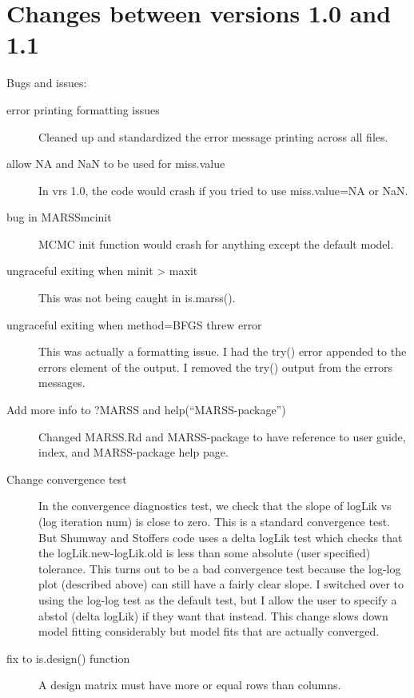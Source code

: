 \documentclass[12pt]{article}
\begin{document}
\section{Changes between versions 1.0 and 1.1}
Bugs and issues:
\begin{description}
    \item[error printing formatting issues]Cleaned up and standardized the error message printing across all files.
    \item[allow NA and NaN to be used for miss.value]In vrs 1.0, the code would crash if you tried to use miss.value=NA or NaN.
    \item[bug in MARSSmcinit]MCMC init function would crash for anything except the default model.
    \item[ungraceful exiting when minit > maxit]This was not being caught in is.marss().
    \item[ungraceful exiting when method=BFGS threw error]This was actually a formatting issue. I had the try() error appended to the errors element of the output.  I removed the try() output from the errors messages.
    \item[Add more info to ?MARSS and help(``MARSS-package'')]Changed MARSS.Rd and MARSS-package to have reference to user guide, index, and MARSS-package help page.
    \item[Change convergence test]In the convergence diagnostics test, we check that the slope of logLik vs (log iteration num) is close to zero.  This is a standard convergence test.  But Shumway and Stoffers code uses a delta logLik test which checks that the logLik.new-logLik.old is less than some absolute (user specified) tolerance.  This turns out to be a bad convergence test because the log-log plot (described above) can still have a fairly clear slope.  I switched over to using the log-log test as the default test, but I allow the user to specify a abstol (delta logLik) if they want that instead.  This change slows down model fitting considerably but model fits that are actually converged.
    \item[fix to is.design() function]A design matrix must have more or equal rows than columns.

\end{description}
\end{document}
